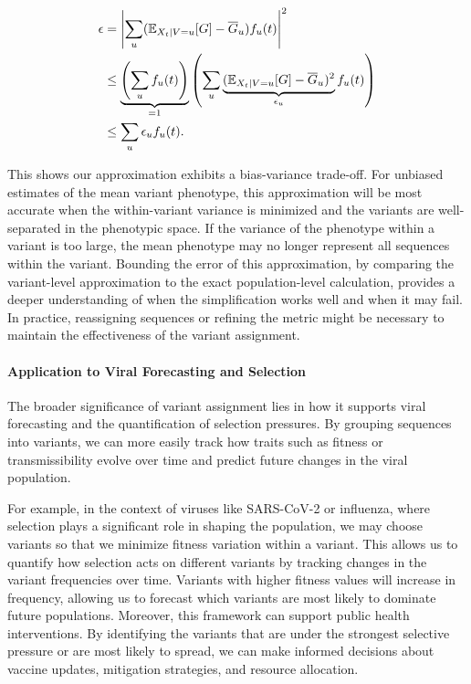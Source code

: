 \begin{align}
  \epsilon  &= \left| \sum_{u} (\mathbb{E}_{X_{t} \mid V=u}[G] - \overline{G}_u) f_u(t)  \right|^2\\
            &\leq \underbrace{\left(\sum_{u} f_u(t) \right)}_{=1} \left(\sum_{u}  \underbrace{(\mathbb{E}_{X_{t} \mid V=u}[G] - \overline{G}_u)^2}_{\epsilon_u} f_u(t)\right)\\
            &\leq \sum_{u} \epsilon_u f_u(t).
\end{align}

This shows our approximation exhibits a bias-variance trade-off.
For unbiased estimates of the mean variant phenotype, this approximation will be most accurate when the within-variant variance is minimized and the variants are well-separated in the phenotypic space.
If the variance of the phenotype within a variant is too large, the mean phenotype may no longer represent all sequences within the variant.
Bounding the error of this approximation, by comparing the variant-level approximation to the exact population-level calculation, provides a deeper understanding of when the simplification works well and when it may fail.
In practice, reassigning sequences or refining the metric might be necessary to maintain the effectiveness of the variant assignment.

\paragraph{Application to Viral Forecasting and Selection}

The broader significance of variant assignment lies in how it supports viral forecasting and the quantification of selection pressures.
By grouping sequences into variants, we can more easily track how traits such as fitness or transmissibility evolve over time and predict future changes in the viral population.

For example, in the context of viruses like SARS-CoV-2 or influenza, where selection plays a significant role in shaping the population, we may choose variants so that we minimize fitness variation within a variant.
This allows us to quantify how selection acts on different variants by tracking changes in the variant frequencies over time.
Variants with higher fitness values will increase in frequency, allowing us to forecast which variants are most likely to dominate future populations.
Moreover, this framework can support public health interventions.
By identifying the variants that are under the strongest selective pressure or are most likely to spread, we can make informed decisions about vaccine updates, mitigation strategies, and resource allocation.

